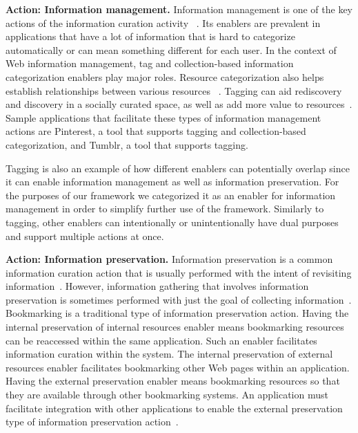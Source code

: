 \documentclass[review]{elsarticle}
\newcommand{\feature}[1]{{\ttfamily#1}}
\begin{document}
{{%
\textbf{Action: Information management.} Information management is one of the key actions of the information curation activity ~\cite{beagrie2008digital,whittaker2011personal}. Its enablers are prevalent in applications that have a lot of information that is hard to categorize automatically or can mean something different for each user. In the context of Web information management, \feature{tag} and \feature{collection-based} information categorization enablers play major roles.
%
Resource categorization also helps establish relationships between various resources ~\cite{beagrie2008digital,whittaker2011personal}. Tagging can aid rediscovery and discovery in a socially curated space, as well as add more value to resources~\cite{gruber2007ontology}. Sample applications that facilitate these types of information management actions are Pinterest, a tool that supports tagging and collection-based categorization, and Tumblr, a tool that supports tagging.

Tagging is also an example of how different enablers can potentially overlap since it can enable information management as well as information preservation. For the purposes of our framework we categorized it as an enabler for information management in order to simplify further use of the framework. Similarly to tagging, other enablers can intentionally or unintentionally have dual purposes and support multiple actions at once.



\textbf{Action: Information preservation.} Information preservation is a common information curation action that is usually performed with the intent of revisiting information~\cite{abrams1998information,whittaker2011personal}. However, information gathering that involves information preservation is sometimes performed with just the goal of collecting information~\cite{lindley2012s}. 
%
Bookmarking is a traditional type of information preservation action. Having the \feature{internal preservation of internal resources} enabler means bookmarking resources can be reaccessed within the same application. Such an enabler facilitates information curation within the system. The \feature{internal preservation of external resources} enabler facilitates bookmarking other Web pages within an application. Having the \feature{external preservation} enabler means bookmarking resources so that they are available through other bookmarking systems. An application must facilitate integration with other applications to enable the external preservation type of information preservation action~\cite{abrams1998information}.
%

}}
\end{document}
